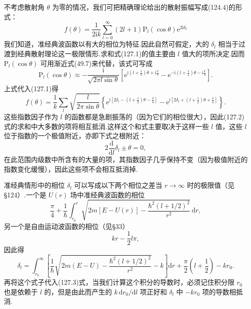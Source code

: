 不考虑散射角 $\theta$ 为零的情况，我们可把精确理论给出的散射振幅写成(124.4)的形式：
\begin{equation}
  f(\theta)=\frac{1}{2\mathrm{i}k}\sum_{l=0}^{\infty}(2l+1)
  \mathrm{P}_l(\cos\theta)\mathrm{e}^{2\mathrm{i}\delta_l}
\end{equation}
我们知道，准经典波函数以有大的相位为特征.因此自然可假定，大的 $\delta_l$ 相当于过渡到经典散射理论这一极限情形.求和式(127.1)的值主要由 $l$ 值大的项所决定.因而 $\mathrm{P}_l(\cos\theta)$ 可用渐近式(49.7)来代替，该式可写成
\begin{equation*}
  \mathrm{P}_l(\cos\theta)\approx-\frac{\mathrm{i}}{\sqrt{2\pi l\sin\theta}}
  \left[\mathrm{e}^{\mathrm{i}\left(l+\frac{1}{2}\right)\theta+\mathrm{i}\frac{\pi}{4}}
  -\mathrm{e}^{-\mathrm{i}\left(l+\frac{1}{2}\right)\theta-\mathrm{i}\frac{\pi}{4}}\right].
\end{equation*}
上式代入(127.1)得
\begin{equation}
  f(\theta)=\frac{1}{k}\sum_l\sqrt{\frac{l}{2\pi\sin\theta}}
  \left\{\mathrm{e}^{\mathrm{i}\left[2\delta_l-\left(l+\frac{1}{2}\right)\theta-\frac{\pi}{4}\right]}
  -\mathrm{e}^{\mathrm{i}\left[2\delta_l+\left(l+\frac{1}{2}\right)\theta+\frac{\pi}{4}\right]}\right\}.
\end{equation}
这些指数因子作为 $l$ 的函数都是急剧振荡的（因为它们的相位很大），因此(127.2)式的求和中大多数的项将相互抵消.这样这个和式主要取决于这样一些 $l$ 值，这些 $l$ 位于指数的一个极值附近，亦即下式之根附近：
\begin{equation}
  2\frac{\mathrm{d}}{\mathrm{d}l}\delta_l\pm\theta=0,
\end{equation}
在此范围内级数中所含有的大量的项，其指数因子几乎保持不变（因为极值附近的指数变化缓慢），因此这些项不会相互抵消掉.

准经典情形中的相位 $\delta_l$ 可以写成以下两个相位之差当 $r\to\infty$ 时的极限值（见§124）.一个是 $U(r)$ 场中准经典波函数的相位
\begin{equation*}
  \frac{\pi}{4}+\frac{1}{\hbar}\int_{r_0}^{r}
  \sqrt{2m[E-U(r)]-\frac{\hbar^2(l+1/2)^2}{r^2}}\,\mathrm{d}r,
\end{equation*}
另一个是自由运动波函数的相位（见§33）
\begin{equation*}
  kr-\frac{1}{2}l\pi,
\end{equation*}
因此得
\begin{equation}
  \delta_l=\int_{r_0}^{\infty}\left[
  \frac{1}{\hbar}\sqrt{2m(E-U)-\frac{\hbar^2(l+1/2)^2}{r^2}}-k
  \right]\mathrm{d}r
  +\frac{\pi}{2}\left(l+\frac{1}{2}\right)-kr_0.
\end{equation}
再将这个式子代入(127.3)式，当我们计算这个积分的导数时，必须记住积分限 $r_0$ 也是依赖于 $l$ 的，但是由此而产生的 $k\,\mathrm{d}r_0/\mathrm{d}l$ 项正好和 $\delta_l$ 中 $-kr_0$ 项的导数相抵消.

